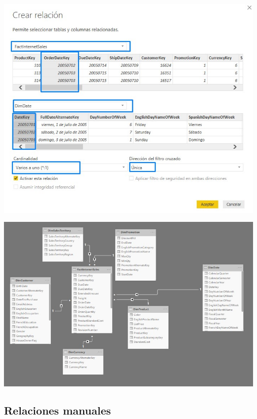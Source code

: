 \begin{center}
\includegraphics[width=\columnwidth]{images/task1/task1-03}\newline
\end{center}

\begin{center}
\includegraphics[width=\columnwidth]{images/task1/task1-04}\newline
\end{center}

\subsection{ Relaciones manuales}

